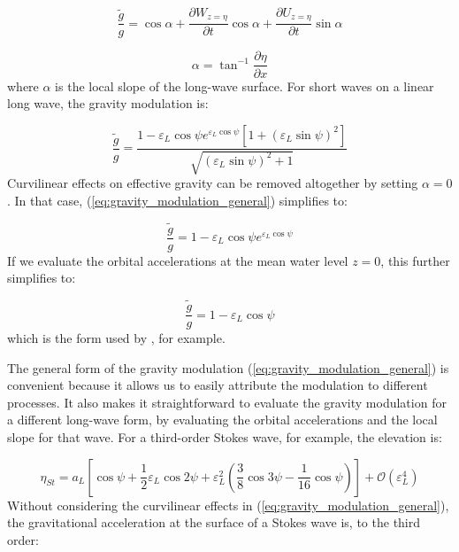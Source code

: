 \documentclass[lineno]{jfm}
\begin{document}
\begin{equation}
\label{eq:gravity_modulation_general}
\frac{\widetilde{g}}{g}
  = \cos{\alpha} 
  + \dfrac{\partial W_{z=\eta}}{\partial t} \cos{\alpha}
  + \dfrac{\partial U_{z=\eta}}{\partial t} \sin{\alpha}
\end{equation}

\begin{equation}
\label{eq:local_slope}
\alpha = \tan^{-1}{\dfrac{\partial \eta}{\partial x}}
\end{equation}
where $\alpha$ is the local slope of the long-wave surface.
For short waves on a linear long wave, the gravity modulation is:

\begin{equation}
\label{eq:gravity_modulation_linear}
\frac{\widetilde{g}}{g}
  = 
  \frac{
    1 - \varepsilon_L \cos{\psi} e^{\varepsilon_L \cos{\psi}}
    \left[ 1 + \left(\varepsilon_L \sin{\psi}\right)^2 \right]
  }
  {\sqrt{\left(\varepsilon_L \sin{\psi}\right)^2 + 1}}
\end{equation}
Curvilinear effects on effective gravity can be removed altogether by setting
$\alpha = 0$.
In that case, (\ref{eq:gravity_modulation_general}) simplifies to:

\begin{equation}
\label{eq:gravity_modulation_linear_no_curvature}
\frac{\widetilde{g}}{g} = 1 - \varepsilon_L \cos{\psi} e^{\varepsilon_L \cos{\psi}}
\end{equation}
If we evaluate the orbital accelerations at the mean water level $z=0$,
this further simplifies to:

\begin{equation}
\label{eq:gravity_modulation_linear_no_curvature_mean_level}
\frac{\widetilde{g}}{g} = 1 - \varepsilon_L \cos{\psi}
\end{equation}
which is the form used by \citet{peureux2021unsteady}, for example.

The general form of the gravity modulation (\ref{eq:gravity_modulation_general})
is convenient because it allows us to easily attribute the modulation to
different processes.
It also makes it straightforward to evaluate the gravity modulation for a
different long-wave form, by evaluating the orbital accelerations and the local
slope for that wave.
For a third-order Stokes wave, for example, the elevation is:

\begin{equation}
\label{eq:eta_stokes}
\eta_{St} = a_L \left[
  \cos{\psi} +
  \dfrac{1}{2} \varepsilon_L \cos{2\psi} +
  \varepsilon_L^2 \left( \dfrac{3}{8} \cos{3\psi} - \dfrac{1}{16} \cos{\psi} \right)
\right] + \mathcal{O}(\varepsilon_L^4)
\end{equation}
Without considering the curvilinear effects in (\ref{eq:gravity_modulation_general}),
the gravitational acceleration at the surface of a Stokes wave is, to the third
order:
\end{document}
